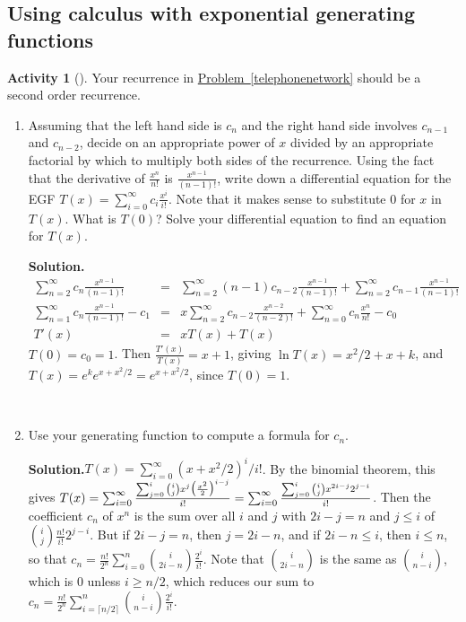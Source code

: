 \documentclass[10pt,]{book}
\theoremstyle{plain}
\theoremstyle{definition}
\newtheorem{activity}[project]{Activity}
\numberwithin{equation}{chapter}
\newcommand{\amp}{&}
\begin{document}
\typeout{************************************************}
\typeout{************************************************}
\subsection[{Using calculus  with exponential generating functions}]{Using calculus  with exponential generating functions}\label{subsection-77}
\begin{activity}[]\label{activity-351}
Your recurrence in \hyperref[telephonenetwork]{Problem~\ref{telephonenetwork}} should be a second order recurrence.%
~\par
\begin{enumerate}[label=(\alph*)]
 \item Assuming that the left hand side is \(c_n\) and the right hand side involves \(c_{n-1}\) and \(c_{n-2}\), decide on an appropriate power of \(x\) divided by an appropriate factorial by which to multiply both sides of the recurrence.  Using the fact that the derivative of \(\frac{x^n}{n!}\) is \(\frac{x^{n-1}}{(n-1)!}\), write down a differential equation for the EGF \(T(x) =
\sum_{i=0}^\infty c_i\frac{x^i}{i!}\).  Note that it makes sense to substitute 0 for \(x\) in \(T(x)\).  What is \(T(0)\)?  Solve your differential equation to find an equation for \(T(x)\).%
\par\medskip\noindent%
\textbf{Solution.}\quad %
\begin{align*}
\sum_{n=2}^\infty c_n\frac{x^{n-1}}{(n-1)!}
\!\amp =\amp \!\sum_{n=2}^\infty(n-1) c_{n-2}\frac{x^{n-1}}{(n-1)!} +
\sum_{n=2}^\infty c_{n-1}\frac{x^{n-1}}{(n-1)!}\\
\sum_{n=1}^\infty c_n\frac{x^{n-1}}{(n-1)!}- c_1 \!\amp =\amp \! x\sum_{n=2}^\infty
c_{n-2}\frac{x^{n-2}}{(n-2)!} + \sum_{n=0}^\infty c_n\frac{x^n}{n!} -c_0\\
T'(x)\!\amp =\amp \!xT(x) +T(x)
\end{align*}
\(T(0) = c_0 =1\). Then \(\frac{T'(x)}{T(x)} = x+1\), giving \(\ln T(x)
=x^2/2+x+k\), and \(T(x) =e^ke^{x+ x^2/2}=e^{x+x^2/2 }\), since \(T(0)=1\).%

~\par
\item Use your generating function to compute a formula for \(c_n\).%
\par\medskip\noindent%
\textbf{Solution.}\quad \(T(x) = \sum_{i=0}^\infty (x+x^2/2)^i/i!\). By the binomial theorem, this gives \(T(x) = \sum_{i=0}^\infty {\sum_{j=0}^i \binom{i}{j}x^j\bigl(\frac{x^2}{2}\bigr)^{i-j}\over
i!}=\sum_{i=0}^\infty{\sum_{j=0}^i\binom{i}{j}x^{2i-j}2^{j-i}\over i!}\). Then the coefficient \(c_n\) of \(x^n\) is the sum over all \(i\) and \(j\) with \(2i-j=n\) and \(j\le i\) of \(\binom{i}{j}\frac{n!}{i!}2^{j-i}\). But if \(2i-j=n\), then \(j= 2i-n\), and if \(2i-n\le i\), then \(i\le n\), so that \(c_n
= \frac{n!}{2^n}\sum_{i=0}^n\binom{i}{2i-n}\frac{2^i}{i!}\). Note that \(\binom{i}{2i-n}\) is the same as \(\binom{i}{n-i}\), which is 0 unless \(i\ge
n/2\), which reduces our sum to \(c_n = \frac{n!}{2^n}\sum_{i=\lceil n/2\rceil}^n\binom{i}{n-i}\frac{2^i}{i!}\).%

\end{enumerate}
\end{activity}
\end{document}
